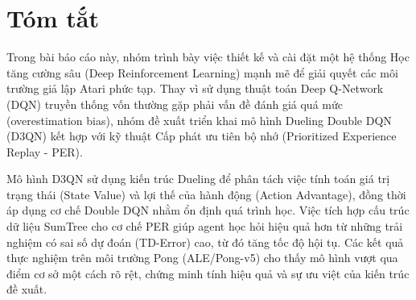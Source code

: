 \section*{Tóm tắt}

Trong bài báo cáo này, nhóm trình bày việc thiết kế và cài đặt một hệ thống Học tăng cường sâu (Deep Reinforcement Learning) mạnh mẽ để giải quyết các môi trường giả lập Atari phức tạp. Thay vì sử dụng thuật toán Deep Q-Network (DQN) truyền thống vốn thường gặp phải vấn đề đánh giá quá mức (overestimation bias), nhóm đề xuất triển khai mô hình Dueling Double DQN (D3QN) kết hợp với kỹ thuật Cấp phát ưu tiên bộ nhớ (Prioritized Experience Replay - PER). 

Mô hình D3QN sử dụng kiến trúc Dueling để phân tách việc tính toán giá trị trạng thái (State Value) và lợi thế của hành động (Action Advantage), đồng thời áp dụng cơ chế Double DQN nhằm ổn định quá trình học. Việc tích hợp cấu trúc dữ liệu SumTree cho cơ chế PER giúp agent học hỏi hiệu quả hơn từ những trải nghiệm có sai số dự đoán (TD-Error) cao, từ đó tăng tốc độ hội tụ. Các kết quả thực nghiệm trên môi trường Pong (ALE/Pong-v5) cho thấy mô hình vượt qua điểm cơ sở một cách rõ rệt, chứng minh tính hiệu quả và sự ưu việt của kiến trúc đề xuất.
